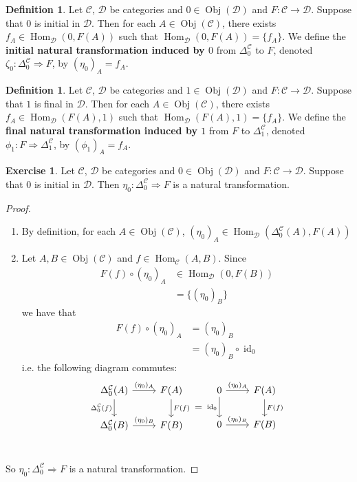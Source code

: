 \documentclass{book}
\theoremstyle{definition}
\newtheorem{defn}[definition]{Definition}
\newtheorem{ex}[definition]{Exercise}
\newcommand{\Del}{\Delta}
\newcommand{\MC}{\mathcal{C}}
\newcommand{\MD}{\mathcal{D}}
\newcommand{\lex}[1]{\label{ex:#1}}
\newcommand{\ld}[1]{\label{defn:#1}}
\DeclareMathOperator{\id}{id}
\DeclareMathOperator{\Obj}{Obj}
\DeclareMathOperator{\Hom}{Hom}
\DeclareMathOperator*{\0}{\mbf{0}}
\DeclareMathOperator*{\1}{\mbf{1}}
\begin{document}
	\begin{defn} \ld{15017}
		Let $\MC$, $\MD$ be categories and $0 \in \Obj(\MD)$ and $F: \MC \rightarrow \MD$. Suppose that $0$ is initial in $\MD$. Then for each $A \in \Obj(\MC)$, there exists $f_A \in \Hom_{\MD}(0, F(A))$ such that $\Hom_{\MD}(0, F(A)) = \{f_A\}$. We define the \textbf{initial natural transformation induced by $0$} from $\Del^{\MC}_0$ to $F$, denoted $\zeta_{0}: \Del^{\MC}_0 \Rightarrow F$, by 
		$(\eta_0)_A = f_A$.
	\end{defn}

	\begin{defn} \ld{15017.1}
		Let $\MC$, $\MD$ be categories and $1 \in \Obj(\MD)$ and $F: \MC \rightarrow \MD$. Suppose that $1$ is final in $\MD$. Then for each $A \in \Obj(\MC)$, there exists $f_A \in \Hom_{\MD}(F(A), 1)$ such that $\Hom_{\MD}(F(A), 1) = \{f_A\}$. We define the \textbf{final natural transformation induced by $1$} from $F$ to $\Del^{\MC}_1$, denoted $\phi_{1}: F \Rightarrow \Del^{\MC}_1$, by 
		$(\phi_{1})_A = f_A$.
	\end{defn}

	\begin{ex} \lex{15018}
		Let $\MC$, $\MD$ be categories and $0 \in \Obj(\MD)$ and $F: \MC \rightarrow \MD$. Suppose that $0$ is initial in $\MD$. Then $\eta_0: \Del^{\MC}_0 \Rightarrow F$ is a natural transformation.
	\end{ex}

	\begin{proof} \
		\begin{enumerate}
			\item By definition, for each $A \in \Obj(\MC)$, $(\eta_0)_A \in \Hom_{\MD}(\Del^{\MC}_0(A), F(A))$
			\item Let $A, B \in \Obj(\MC)$ and $f \in \Hom_{\MC}(A, B)$. Since 
			\begin{align*}
				F(f) \circ (\eta_0)_A 
				& \in \Hom_{\MD}(0, F(B)) \\
				& = \{(\eta_0)_B\}
			\end{align*}
			we have that 
			\begin{align*}
				F(f) \circ (\eta_0)_A 
				& = (\eta_0)_B \\
				& = (\eta_0)_B \circ \id_0 
			\end{align*}
			i.e. the following diagram commutes:
			\[ 
			\begin{tikzcd}[baseline= 7]
				\Del^{\MC}_0(A)  \arrow[r, "(\eta_0)_A"]  \arrow[d, "\Del^{\MC}_0(f)"']  & F(A)   \arrow[d, "F(f)"]\\
				\Del^{\MC}_0(B) \arrow[r, "(\eta_0)_B"] &  F(B) \\
			\end{tikzcd}
			=
			\begin{tikzcd}[baseline= 7]
				0  \arrow[r, "(\eta_0)_A"]  \arrow[d, "\id_0"']  & F(A)   \arrow[d, "F(f)"]\\
				0 \arrow[r, "(\eta_0)_B"] &  F(B) \\
			\end{tikzcd}
			\]
		\end{enumerate}
		So $\eta_0: \Del^{\MC}_0 \Rightarrow F$ is a natural transformation.
	\end{proof}
	
\end{document}
